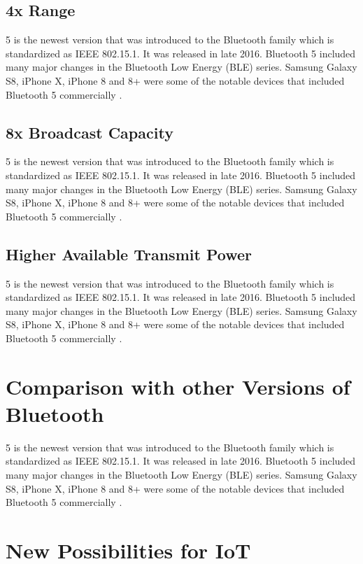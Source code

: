 \documentclass[journal, a4paper]{IEEEtran}
\begin{document}
\subsection{4x Range}

5 is the newest version that was introduced to the Bluetooth family which is standardized as IEEE 802.15.1. It was released in late 2016. Bluetooth 5 included many major changes in the Bluetooth Low Energy (BLE) series. Samsung Galaxy S8, iPhone X, iPhone 8 and 8+ were some of the notable devices that included Bluetooth 5 commercially \cite{WIKI}. 

\subsection{8x Broadcast Capacity}

5 is the newest version that was introduced to the Bluetooth family which is standardized as IEEE 802.15.1. It was released in late 2016. Bluetooth 5 included many major changes in the Bluetooth Low Energy (BLE) series. Samsung Galaxy S8, iPhone X, iPhone 8 and 8+ were some of the notable devices that included Bluetooth 5 commercially \cite{WIKI}. 

\subsection{Higher Available Transmit Power}

5 is the newest version that was introduced to the Bluetooth family which is standardized as IEEE 802.15.1. It was released in late 2016. Bluetooth 5 included many major changes in the Bluetooth Low Energy (BLE) series. Samsung Galaxy S8, iPhone X, iPhone 8 and 8+ were some of the notable devices that included Bluetooth 5 commercially \cite{WIKI}. 


\section{Comparison with other Versions of Bluetooth}

5 is the newest version that was introduced to the Bluetooth family which is standardized as IEEE 802.15.1. It was released in late 2016. Bluetooth 5 included many major changes in the Bluetooth Low Energy (BLE) series. Samsung Galaxy S8, iPhone X, iPhone 8 and 8+ were some of the notable devices that included Bluetooth 5 commercially \cite{WIKI}. 


\section{New Possibilities for IoT}
\end{document}
